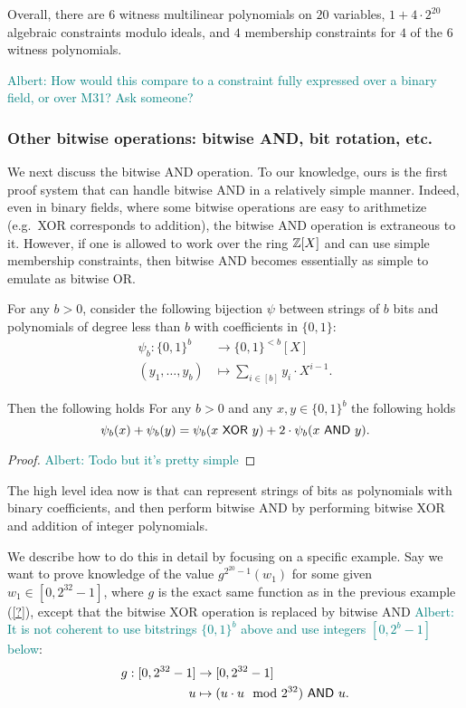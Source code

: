 \documentclass[11pt,letterpaper,usenames,dvipsnames]{article}
\newcommand{\albert}[1]{\textcolor{teal}{Albert: {#1}}}
\begin{document}
    Overall, there are $6$ witness multilinear polynomials on $20$ variables, $1 +4\cdot 2^{20}$ algebraic constraints modulo ideals, and $4$ membership constraints for $4$ of the $6$ witness polynomials. 

    \albert{How would this compare to a constraint fully expressed over a binary field, or over M31? Ask someone? }
    
\subsubsection{Other bitwise operations: bitwise AND, bit rotation, etc.}


We next discuss the bitwise AND operation. To our knowledge, ours is the first proof system that can handle bitwise AND in a relatively simple manner. Indeed, even in binary fields, where some bitwise operations are easy to arithmetize (e.g.\ XOR corresponds to addition), the bitwise AND operation is extraneous to it. However, if one is allowed to work over the ring $\mathbb{Z}[X]$ and can use simple membership constraints, then bitwise AND becomes essentially as simple to emulate as bitwise OR. 

For any $b> 0$, consider the following bijection $\psi$ between strings of $b$ bits and polynomials of degree less than $b$ with coefficients in $\{0,1\}$:
%
\begin{align*}
\psi_b: \{0,1\}^{b} &\to \{0,1\}^{<b}[X]\\
(y_1,\ldots, y_{b}) &\mapsto \sum_{i\in [b]} y_i\cdot X^{i-1}.
\end{align*}


\begin{lemma}Then the following holds
%
For any $b>0$ and any $x,y\in \{0,1\}^{b}$ the following holds
$$
\psi_b(x) + \psi_b(y) = \psi_b(x \ \mathsf{XOR}\  y) + 2\cdot \psi_b(x \ \mathsf{AND}\  y).
$$
\end{lemma}
\begin{proof}
\albert{Todo but it's pretty simple}
\end{proof}
%
The high level idea now is that can represent strings of bits as polynomials with binary coefficients, and then perform bitwise AND by performing bitwise XOR and addition of integer polynomials. 

We describe how to do this in detail by focusing on a specific example.  Say we want to prove knowledge of the value $g^{2^{20}-1}(w_1)$ for some given $w_1\in [0, 2^{32}-1]$, where $g$ is the exact same function as in the previous example (\cref{?}), except that the bitwise XOR operation is replaced by bitwise AND \albert{It is not coherent to use bitstrings $\{0,1\}^b$ above and use integers $[0, 2^{b}-1]$ below}:
%
\begin{align*}
g: [0, 2^{32}-1] &\to [0, 2^{32}-1]\\
u &\mapsto (u\cdot u \mod 2^{32}) \ \mathsf{AND}\  u.
\end{align*}
\end{document}
